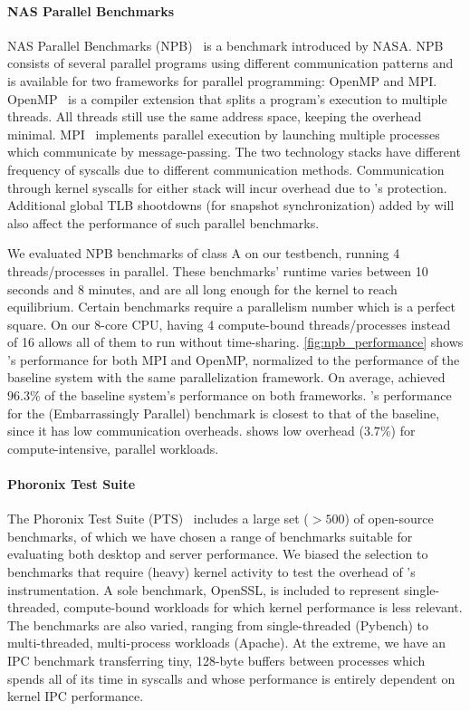 \documentclass[letterpaper,twocolumn,10pt]{article}
\begin{document}
\paragraph{NAS Parallel Benchmarks}
NAS Parallel Benchmarks (NPB)~\cite{npb} is a benchmark introduced by
NASA. 
NPB consists of several parallel programs using different communication
patterns and is available for two frameworks for parallel programming:
OpenMP and MPI.
OpenMP~\cite{dagum1998openmp} is a compiler extension that splits a 
program's execution to multiple threads. 
All threads still use the same address space, keeping the overhead minimal. 
MPI~\cite{snir1998mpi} implements parallel execution by launching multiple
processes which communicate by message-passing. 
The two technology stacks have different frequency of syscalls due to 
different communication methods.
Communication through kernel syscalls for either stack will incur overhead
due to \tiktok's protection.
Additional global TLB shootdowns (for snapshot synchronization) added by 
\tiktok will also affect the performance of such parallel benchmarks.

We evaluated NPB benchmarks of class A on our testbench, running 
4 threads/processes in parallel.
These benchmarks' runtime varies between 10 seconds and 8 minutes, 
and are all long enough for the kernel to reach equilibrium.
Certain benchmarks require a parallelism number which is a perfect square.
On our 8-core CPU, having 4 compute-bound threads/processes instead of 16 allows 
all of them to run without time-sharing.
\autoref{fig:npb_performance} shows \tiktok's performance for both MPI and OpenMP,
normalized to the performance of the baseline system with the same parallelization
framework.
On average, \tiktok achieved $96.3\%$ of the baseline system's performance on 
both frameworks. 
\tiktok's performance for the  (Embarrassingly Parallel) benchmark is 
closest to that of the baseline, since it has low communication overheads.
\tiktok shows low overhead ($3.7\%$) for compute-intensive, parallel workloads.


\paragraph{Phoronix Test Suite}
The Phoronix Test Suite (PTS)~\cite{pts} includes a large set ($>500$) of 
open-source benchmarks, of which we have chosen a range of benchmarks 
suitable for evaluating both desktop and server performance.
We biased the selection to benchmarks that require (heavy) kernel activity to
test the overhead of \tiktok's instrumentation.
A sole benchmark, OpenSSL, is included to represent single-threaded, 
compute-bound workloads for which kernel performance is less relevant.
The benchmarks are also varied, ranging from single-threaded (Pybench) to 
multi-threaded, multi-process workloads (Apache).
At the extreme, we have an IPC benchmark transferring tiny, 128-byte 
buffers between processes which spends all of its time in syscalls
and whose performance is entirely dependent on kernel IPC performance.
\end{document}
